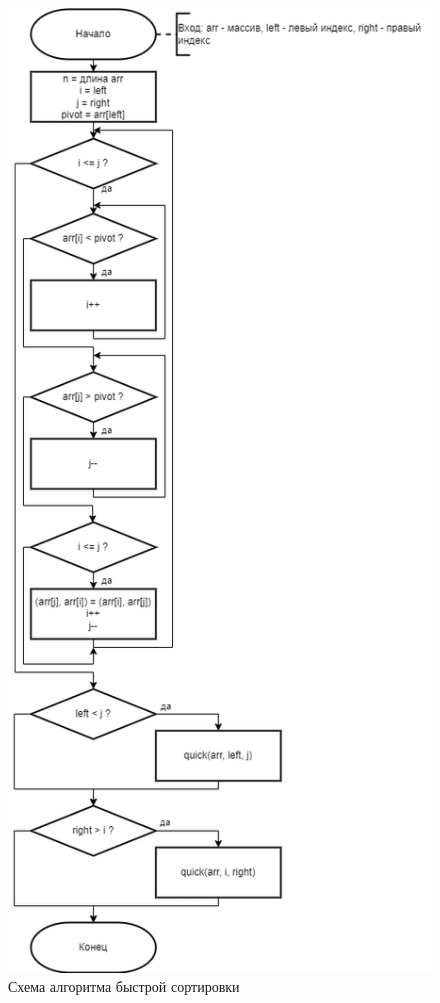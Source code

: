 \begin{figure}[H]
	\centering
	\includegraphics[width=0.7\linewidth, height=0.9\textheight]{inc/img/quick}
	\caption{Схема алгоритма быстрой сортировки}
	\label{fig:quick}
\end{figure}
